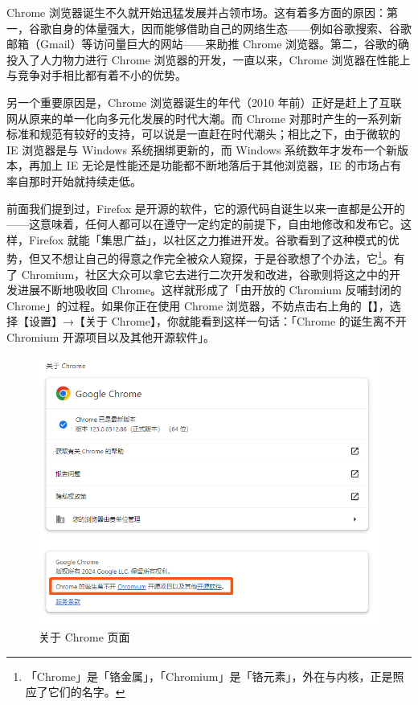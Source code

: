 Chrome 浏览器诞生不久就开始迅猛发展并占领市场。这有着多方面的原因：第一，谷歌自身的体量强大，因而能够借助自己的网络生态——例如谷歌搜索、谷歌邮箱（Gmail）等访问量巨大的网站——来助推 Chrome 浏览器。第二，谷歌的确投入了人力物力进行 Chrome 浏览器的开发，一直以来，Chrome 浏览器在性能上与竞争对手相比都有着不小的优势。

\begin{note}
  另一个重要原因是，Chrome 浏览器诞生的年代（2010 年前）正好是赶上了互联网从原来的单一化向多元化发展的时代大潮。而 Chrome 对那时产生的一系列新标准和规范有较好的支持，可以说是一直赶在时代潮头；相比之下，由于微软的 IE 浏览器是与 Windows 系统捆绑更新的，而 Windows 系统数年才发布一个新版本，再加上 IE 无论是性能还是功能都不断地落后于其他浏览器，IE 的市场占有率自那时开始就持续走低。
\end{note}

前面我们提到过，Firefox 是开源的软件，它的源代码自诞生以来一直都是公开的——这意味着，任何人都可以在遵守一定约定的前提下，自由地修改和发布它。这样，Firefox 就能「集思广益」，以社区之力推进开发。谷歌看到了这种模式的优势，但又不想让自己的得意之作完全被众人窥探，于是谷歌想了个办法，它\footnote{「Chrome」是「铬金属」，「Chromium」是「铬元素」，外在与内核，正是照应了它们的名字。}。有了 Chromium，社区大众可以拿它去进行二次开发和改进，谷歌则将这之中的开发进展不断地吸收回 Chrome。这样就形成了「由开放的 Chromium 反哺封闭的 Chrome」的过程。如果你正在使用 Chrome 浏览器，不妨点击右上角的【】，选择【设置】→【关于 Chrome】，你就能看到这样一句话：「Chrome 的诞生离不开 Chromium 开源项目以及其他开源软件」。

\begin{figure}[htb!]
  \centering
  \includegraphics[width=.8\textwidth]{assets/software/About_chrome.png}
  \caption{关于 Chrome 页面}
  \label{fig:About_chrome}
\end{figure}

